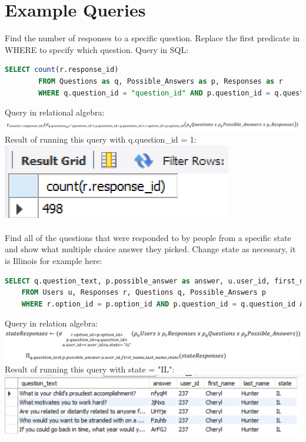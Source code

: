 \documentclass[12pt, oneside, a4paper]{article}
\begin{document}
    \section{Example Queries}
    Find the number of responses to a specific question. Replace the first predicate in WHERE to specify which question. Query in SQL:
    \begin{lstlisting}[language=SQL, columns=flexible, breaklines]
        SELECT count(r.response_id)
        FROM Questions as q, Possible_Answers as p, Responses as r
        WHERE q.question_id = "question_id" AND p.question_id = q.question_id AND r.option_id = p.option_id
    \end{lstlisting}
    Query in relational algebra:\\
    \includegraphics{responsecountqueryalgebra.PNG}
    Result of running this query with q.question\_id = 1:
    \includegraphics{responsecountquery.PNG}
    \\
    \\
    Find all of the questions that were responded to by people from a specific state and show what multiple choice answer they picked. Change state as necessary, it is Illinois for example here:
    \begin{lstlisting}[language=SQL, columns=flexible, breaklines]
    SELECT q.question_text, p.possible_answer as answer, u.user_id, first_name, last_name, state
    FROM Users u, Responses r, Questions q, Possible_Answers p
    WHERE r.option_id = p.option_id AND p.question_id = q.question_id AND u.user_id = r.user_id AND state = "IL";
    \end{lstlisting}
    Query in relation algebra: \\
    \includegraphics[scale=0.6]{questionstatequeryalgebra.PNG}
    Result of running this query with state = "IL":\\
    \includegraphics{questionstatequeryresult.PNG}
\end{document}
